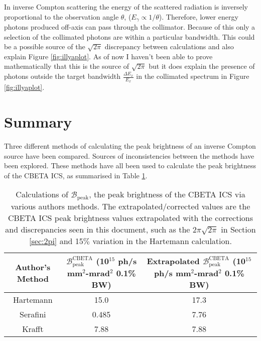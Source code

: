 \documentclass[10pt]{article}
\begin{document}
In inverse Compton scattering the energy of the scattered radiation is inversely proportional to the observation angle $\theta$,  ($E_{\gamma} \propto 1/\theta$). Therefore, lower energy photons produced off-axis can pass through the collimator. Because of this only a selection of the collimated photons are within a particular bandwidth. This could be a possible source of the $\sqrt{2\pi}$ discrepancy between calculations and also explain Figure \ref{fig:illyaplot}. As of now I haven't been able to prove mathematically that this is the source of $\sqrt{2\pi}$ but it does explain the presence of photons outside the target bandwidth $\frac{\Delta E_{x}}{E_{x}}$ in the collimated spectrum in Figure \ref{fig:illyaplot}.  

        


\section*{Summary}

Three different methods of calculating the peak brightness of an inverse Compton source have been compared. Sources of inconsistencies between the methods have been explored. These methods have all been used to calculate the peak brightness of the CBETA ICS, as summarised in Table \ref{tab:CBETAsum}.

\begin{table}[H]
\centering
\begin{tabular}{ccc}
\hline
\hline
Author's Method & $\mathcal{B_{\mathrm{peak}}^{\mathrm{CBETA}}}$ (10$^{15}$ ph/s mm$^{2}$-mrad$^{2}$ 0.1\% BW) & Extrapolated $\mathcal{B_{\mathrm{peak}}^{\mathrm{CBETA}}}$ (10$^{15}$ ph/s mm$^{2}$-mrad$^{2}$ 0.1\% BW) \\
\hline
Hartemann & 15.0 & 17.3 \\
Serafini & 0.485 & 7.76 \\
Krafft & 7.88 & 7.88 \\
\hline
\hline
\end{tabular}
\caption{Calculations of $\mathcal{B_{\mathrm{peak}}}$, the peak brightness of the CBETA ICS via various authors methods. The extrapolated/corrected values are the CBETA ICS peak brightness values extrapolated with the corrections and discrepancies seen in this document, such as the $2\pi\sqrt{2\pi}$ in Section \ref{sec:2pi} and 15$\%$ variation in the Hartemann calculation.}    
\label{tab:CBETAsum}
\end{table}   
   
\end{document}
